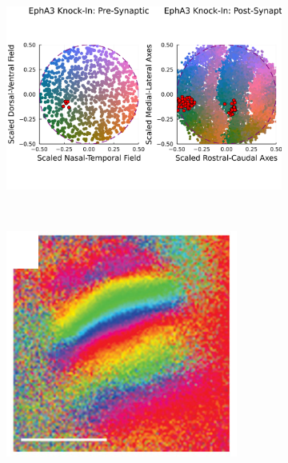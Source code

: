 \begin{figure}
	\begin{subfigure}{\textwidth}
		\centering
		\includegraphics[width=\textwidth]{images/distributed_kernels/figure_distributed_kernels_EphA3}
		\caption{}
	\end{subfigure}
	~
	\begin{subfigure}{0.5\textwidth}
		\centering
		\includegraphics[width=\textwidth]{images/distributed_kernels/ephA3hom}
		\caption{}
	\end{subfigure}
	\qquad\qquad
	\begin{subfigure}{0.3\textwidth}

\end{subfigure}
\end{figure}
